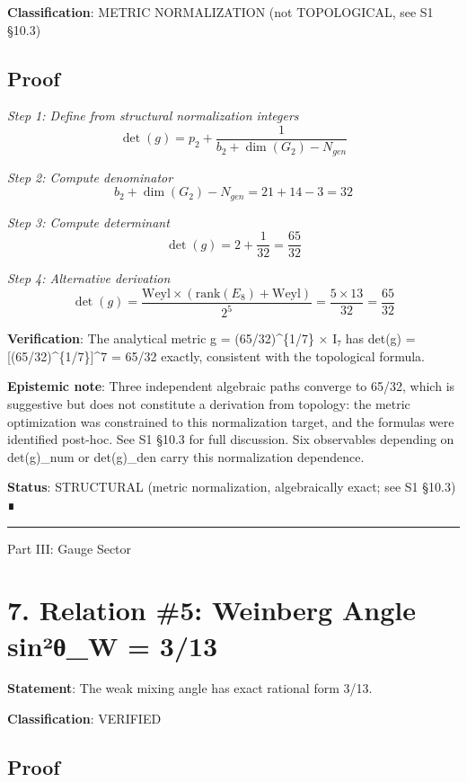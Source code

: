 \documentclass[11pt,a4paper]{article}
\begin{document}
\textbf{Classification}: METRIC NORMALIZATION (not TOPOLOGICAL, see S1 §10.3)

\subsection{Proof}\label{proof-2}

\emph{Step 1: Define from structural normalization integers} \[\det(g) = p_2 + \frac{1}{b_2 + \dim(G_2) - N_{gen}}\]

\emph{Step 2: Compute denominator} \[b_2 + \dim(G_2) - N_{gen} = 21 + 14 - 3 = 32\]

\emph{Step 3: Compute determinant} \[\det(g) = 2 + \frac{1}{32} = \frac{65}{32}\]

\emph{Step 4: Alternative derivation} \[\det(g) = \frac{\text{Weyl} \times (\text{rank}(E_8) + \text{Weyl})}{2^5} = \frac{5 \times 13}{32} = \frac{65}{32}\]

\textbf{Verification}: The analytical metric g = (65/32)\^{}\{1/7\} × I₇ has det(g) = {[}(65/32)\^{}\{1/7\}{]}\^{}7 = 65/32 exactly, consistent with the topological formula.

\textbf{Epistemic note}: Three independent algebraic paths converge to 65/32, which is suggestive but does not constitute a derivation from topology: the metric optimization was constrained to this normalization target, and the formulas were identified post-hoc. See S1 §10.3 for full discussion. Six observables depending on det(g)\_\allowbreak{}num or det(g)\_\allowbreak{}den carry this normalization dependence.

\textbf{Status}: STRUCTURAL (metric normalization, algebraically exact; see S1 §10.3) ∎

\begin{center}\rule{\linewidth}{0.5pt}\end{center}

Part III: Gauge Sector

\section{7. Relation \#5: Weinberg Angle sin²θ\_\allowbreak{}W = 3/13}\label{relation-5-weinberg-angle-sinuxb2ux3b8_w-313}

\textbf{Statement}: The weak mixing angle has exact rational form 3/13.

\textbf{Classification}: VERIFIED

\subsection{Proof}\label{proof-3}
\end{document}
